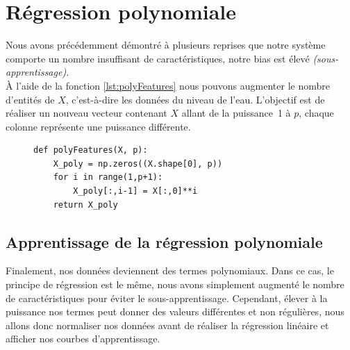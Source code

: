 \section{Régression polynomiale}

Nous avons précédemment démontré à plusieurs reprises que notre système comporte un nombre insuffisant de caractéristiques, notre bias est élevé \textit{(sous-apprentissage)}. \\
À l'aide de la fonction \ref{lst:polyFeatures} nous pouvons augmenter le nombre d'entités de $X$, c'est-à-dire les données du niveau de l'eau. L'objectif est de réaliser un nouveau vecteur contenant $X$ allant de la puissance~1 à $p$, chaque colonne représente une 
puissance différente. 

\begin{figure}[!h]
\begin{verbatim}
def polyFeatures(X, p):
    X_poly = np.zeros((X.shape[0], p))
    for i in range(1,p+1):
        X_poly[:,i-1] = X[:,0]**i
    return X_poly
\end{verbatim}   
\end{figure}


\subsection{Apprentissage de la régression polynomiale}

Finalement, nos données deviennent des termes polynomiaux. Dans ce cas, le principe de régression est le même, nous avons simplement augmenté le nombre de caractéristiques pour 
éviter le sous-apprentissage. 
Cependant, élever à la puissance nos termes peut donner des valeurs différentes et non régulières, nous allons donc normaliser nos données avant de réaliser la régression linéaire et afficher nos courbes d'apprentissage.

